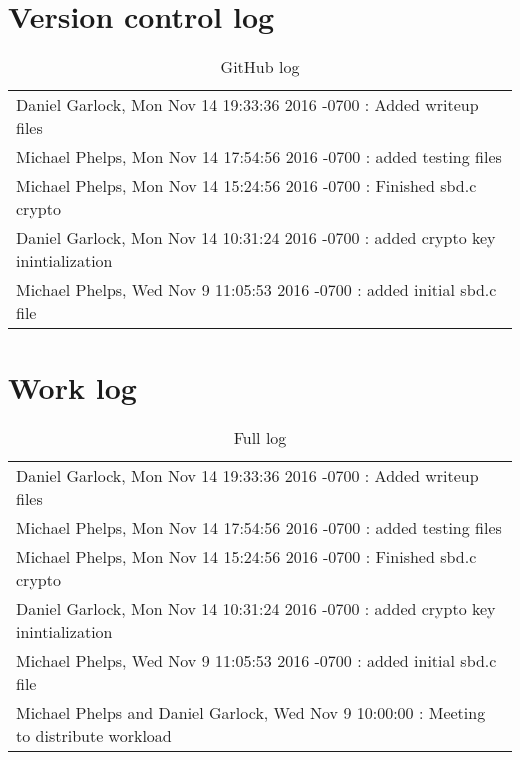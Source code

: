 \documentclass[letterpaper,10pt,titlepage,onecolumn,draftclsnofoot]{IEEETran}
\begin{document}
\newpage
\section{Version control log}
\begin{table}[H]
  \small
\caption{GitHub log}

\begin{tabular}{l}
\hline
Daniel Garlock, Mon Nov 14 19:33:36 2016 -0700 : Added writeup files\\
Michael Phelps, Mon Nov 14 17:54:56 2016 -0700 : added testing files\\
Michael Phelps, Mon Nov 14 15:24:56 2016 -0700 : Finished sbd.c crypto\\
Daniel Garlock, Mon Nov 14 10:31:24 2016 -0700 : added crypto key inintialization\\
Michael Phelps, Wed Nov 9 11:05:53 2016 -0700 : added initial sbd.c file\\
\hline
\end{tabular}
\end{table}

\section{Work log}

\begin{table}[H]
  \small
\caption{Full log}

\begin{tabular}{l}
\hline
Daniel Garlock, Mon Nov 14 19:33:36 2016 -0700 : Added writeup files\\
Michael Phelps, Mon Nov 14 17:54:56 2016 -0700 : added testing files\\
Michael Phelps, Mon Nov 14 15:24:56 2016 -0700 : Finished sbd.c crypto\\
Daniel Garlock, Mon Nov 14 10:31:24 2016 -0700 : added crypto key inintialization\\
Michael Phelps, Wed Nov 9 11:05:53 2016 -0700 : added initial sbd.c file\\
Michael Phelps and Daniel Garlock, Wed Nov 9 10:00:00 : Meeting to distribute workload\\

\hline
\end{tabular}
\end{table}
\end{document}
